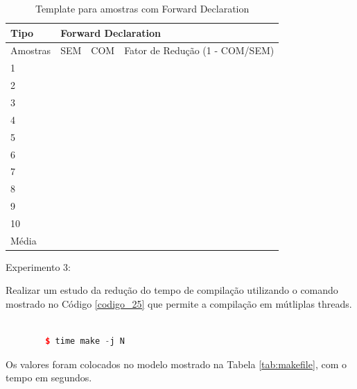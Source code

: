 \begin{table}[h]
\centering
\caption{Template para amostras com Forward Declaration}
\label{tab:modelo_forward_declaration}
\begin{tabular}{|l|l|l|l|}
\hline
Tipo & \multicolumn{3}{l|}{Forward Declaration} \\ \hline
Amostras & SEM & COM & Fator de Redução (1 - COM/SEM) \\ \hline
1 &  &  &  \\ \hline
2 &  &  &  \\ \hline
3 &  &  &  \\ \hline
4 &  &  &  \\ \hline
5 &  &  &  \\ \hline
6 &  &  &  \\ \hline
7 &  &  &  \\ \hline
8 &  &  &  \\ \hline
9 &  &  &  \\ \hline
10 &  &  &  \\ \hline
Média &  &  &  \\ \hline
\end{tabular}
\end{table}



Experimento 3:  


Realizar um estudo da redução do tempo de compilação utilizando o comando
 mostrado no Código \ref{codigo_25} que permite a compilação em
 mútliplas threads.


\begin{lstlisting}[language=C++,frame=single,caption={Código 25:Execução programa 
								time mais programa make executando com threads},
                                                  			 label=codigo_25]

        $ time make -j N
\end{lstlisting}

Os valores foram colocados no modelo mostrado na Tabela \ref{tab:makefile},
 com o tempo em segundos.

